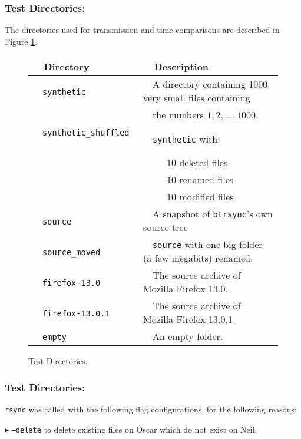 \documentclass[11pt]{llncs}
\newcommand{\btrsync}{\texttt{btrsync}\xspace}
\newcommand{\rsync}{\texttt{rsync}\xspace}
\begin{document}
\subsubsection{Test Directories:} The directories used for transmission and time comparisons are described in Figure \ref{tab:benchdirec}.\smallskip

\begin{figure}
\begin{center}
\begin{tabular}{ll}\toprule
~~{\bf Directory}              ~~&~~{\bf Description}\\\midrule
~~{\tt synthetic}              ~~&~~A directory containing 1000 very small files containing~~\\
~~                             ~~&~~the numbers $1,2,\ldots,1000$. \\
~~{\tt synthetic\_shuffled}    ~~&~~{\tt synthetic} with:\\
                             ~~& ~~~~~10 deleted files\\
                             ~~& ~~~~~10 renamed files \\
                             ~~& ~~~~~10 modified files \\
~~{\tt source}                 ~~& ~~A snapshot of \btrsync's own source tree \\
~~{\tt source\_moved}          ~~& ~~{\tt source} with one big folder (a few megabits) renamed.~~\\
~~{\tt firefox-13.0}           ~~& ~~The source archive of Mozilla Firefox 13.0.\\
~~{\tt firefox-13.0.1}         ~~& ~~The source archive of Mozilla Firefox 13.0.1\\
~~{\tt empty}                  ~~& ~~An empty folder.\\\bottomrule
\end{tabular}\smallskip
  \caption{Test Directories.}
  \label{tab:benchdirec}
\end{center}
\end{figure}

\subsubsection{Test Directories:} \rsync was called with the following flag configurations, for the following reasons:

$\blacktriangleright$ {\tt --delete} to delete existing files on Oscar which do not exist on Neil.\smallskip
\end{document}
